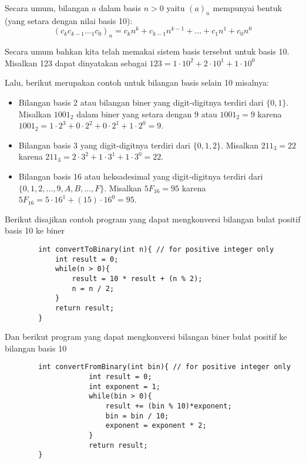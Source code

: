         Secara umum, bilangan $a$ dalam basis $n > 0$ yaitu $(a)_n$ mempunyai bentuk (yang setara dengan nilai basis 10):
        $$(c_kc_{k-1}\dotsc_1c_0)_n = c_{k}n^k + c_{k-1}n^{k-1}+\dots+c_1n^{1}+c_0n^{0}$$
        
        Secara umum bahkan kita telah memakai sistem basis tersebut untuk basis 10. Misalkan 123 dapat dinyatakan sebagai $123 = 1\cdot 10^2 + 2\cdot 10^1 + 1\cdot 10^0$
        
        Lalu, berikut merupakan contoh untuk bilangan basis selain 10 misalnya: 
        \begin{itemize}
            \item Bilangan basis 2 atau bilangan biner yang digit-digitnya terdiri dari $\{0,1\}$. Misalkan $1001_2$ dalam biner yang setara dengan $9$ atau $1001_2 = 9$ karena $1001_2 = 1\cdot 2^3+0\cdot 2^2+0\cdot 2^1+1\cdot 2^0 = 9$. 
            \item Bilangan basis 3 yang digit-digitnya terdiri dari $\{0,1,2\}$. Misalkan $211_3 = 22$ karena $211_3 = 2\cdot 3^2+ 1\cdot 3^1+ 1\cdot 3^0 = 22$.
            \item Bilangan basis 16 atau heksadesimal yang digit-digitnya terdiri dari $\{0,1,2,\dots,9,A,B,\dots,F\}$. Misalkan $5F_{16} = 95$ karena $5F_{16} = 5 \cdot 16^1 + (15)\cdot 16^0 = 95$.
        \end{itemize}
        Berikut disajikan contoh program yang dapat mengkonversi bilangan bulat positif basis 10 ke biner
        \begin{lstlisting}
        int convertToBinary(int n){ // for positive integer only
        	int result = 0;
        	while(n > 0){
        		result = 10 * result + (n % 2);
        		n = n / 2;
        	}
        	return result;
        }
        \end{lstlisting}
        Dan berikut program yang dapat mengkonversi bilangan biner bulat positif ke bilangan basis 10
        \begin{lstlisting}
        int convertFromBinary(int bin){ // for positive integer only
                	int result = 0;
                	int exponent = 1;
                	while(bin > 0){
                		result += (bin % 10)*exponent;
                		bin = bin / 10;
                		exponent = exponent * 2;
                	}
                	return result;
        }
        \end{lstlisting}
    
